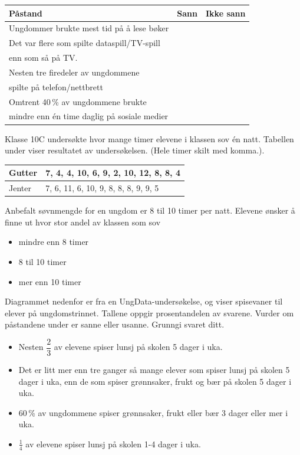 \begin{center}
	\small
	\begin{tabular}{| l | c | c |}
		\hline
		\textbf{Påstand} & \textbf{Sann} & \textbf{Ikke sann} \\ \hline	
	Ungdommer brukte mest tid på å lese bøker & & 	\\ \hline 
	Det var flere som spilte dataspill/TV-spill & & \\
	enn som så på TV. & & \\ \hline
	Nesten tre firedeler av ungdommene& & \\
	spilte på telefon/nettbrett & & \\ \hline
	Omtrent 40\,\% av ungdommene brukte & & \\
	mindre enn én time daglig på sosiale medier & & \\ \hline
	\end{tabular}
\end{center}

Klasse 10C undersøkte hvor mange timer elevene i klassen sov én natt. Tabellen under viser
resultatet av undersøkelsen. (Hele timer skilt med komma.).
\begin{center}
	\begin{tabular}{l|l}
		Gutter & 7, 4, 4, 10, 6, 9, 2, 10, 12, 8, 8, 4 \\ \hline
		Jenter & 7, 6, 11, 6, 10, 9, 8, 8, 8, 9, 9, 5
	\end{tabular}
\end{center}
Anbefalt søvnmengde for en ungdom er 8 til 10 timer per natt. Elevene ønsker å finne ut hvor
stor andel av klassen som sov
\begin{itemize}
	\item mindre enn 8 timer
	\item 8 til 10 timer
	\item mer enn 10 timer
\end{itemize}

\newpage
{}
Diagrammet nedenfor er fra en UngData-undersøkelse, og viser spisevaner til elever på
ungdomstrinnet. Tallene oppgir prosentandelen av svarene.
Vurder om påstandene under er sanne eller usanne. Grunngi svaret ditt.
\begin{itemize}
	\item[(i)] Nesten $\dfrac{2}{3}$ av elevene spiser lunsj på skolen 5 dager i uka.
	\item[(ii)] Det er litt mer enn tre ganger så mange elever som spiser lunsj på
	skolen 5 dager i uka, enn de som spiser grønnsaker, frukt og bær på
	skolen 5 dager i uka.
	\item[(iii)] 60\,\% av ungdommene spiser grønnsaker, frukt eller bær 3 dager eller
	mer i uka.
	\item[(iv)] $\frac{1}{4}$ av elevene spiser lunsj på skolen 1-4 dager i uka.
\end{itemize}

